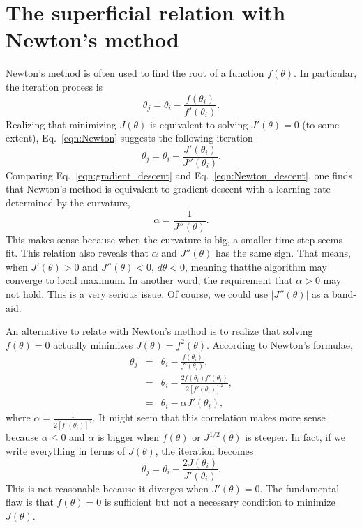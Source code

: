 \section{The superficial relation with Newton's method}
Newton's method is often used to find the root of a function $f(\theta)$. In particular, the iteration process is
\begin{equation}
\theta_j = \theta_i - \frac{f(\theta_i)}{f'(\theta_i)}.\label{eqn:Newton}
\end{equation}
Realizing that minimizing $J(\theta)$ is equivalent to solving $J'(\theta) = 0$ (to some extent), Eq.~\ref{eqn:Newton} suggests the following iteration
\begin{equation}
\theta_j = \theta_i - \frac{J'(\theta_i)}{J''(\theta_i)}.\label{eqn:Newton_descent}
\end{equation}
Comparing Eq.~\ref{eqn:gradient_descent} and Eq.~\ref{eqn:Newton_descent}, one finds that Newton's method is equivalent to gradient descent with a learning rate determined by the curvature,
\begin{equation}
\alpha = \frac{1}{J''(\theta)}.
\end{equation}
This makes sense because when the curvature is big, a smaller time step seems fit. This relation also reveals that $\alpha$ and $J''(\theta)$ has the same sign. That means, when $J'(\theta)>0$ and $J''(\theta)<0$, $d\theta<0$, meaning thatthe algorithm may converge to local maximum. In another word, the requirement that $\alpha > 0$ may not hold. This is a very serious issue. Of course, we could use $|J''(\theta)|$ as a band-aid.

An alternative to relate with Newton's method is to realize that solving $f(\theta)=0$ actually minimizes $J(\theta)=f^2(\theta)$. According to Newton's formulae,
\begin{eqnarray}
\theta_j&=&\theta_i-\frac{f(\theta_i)}{f'(\theta_i)},\\
	&=&\theta_i-\frac{2f(\theta_i)f'(\theta_i)}{2[f'(\theta_i)]^2},\\
	&=&\theta_i-\alpha J'(\theta_i),
\end{eqnarray}
where $\alpha=\frac{1}{2[f'(\theta_i)]^2}$. It might seem that this correlation makes more sense because $\alpha\leq 0$ and $\alpha$ is bigger when $f(\theta)$ or $J^{1/2}(\theta)$ is steeper. In fact, if we write everything in terms of $J(\theta)$, the iteration becomes
\begin{equation}
\theta_j=\theta_i-\frac{2J(\theta_i)}{J'(\theta_i)}.
\end{equation}
This is not reasonable because it diverges when $J'(\theta)=0$. The fundamental flaw is that $f(\theta)=0$ is sufficient but not a necessary condition to minimize $J(\theta)$. 

